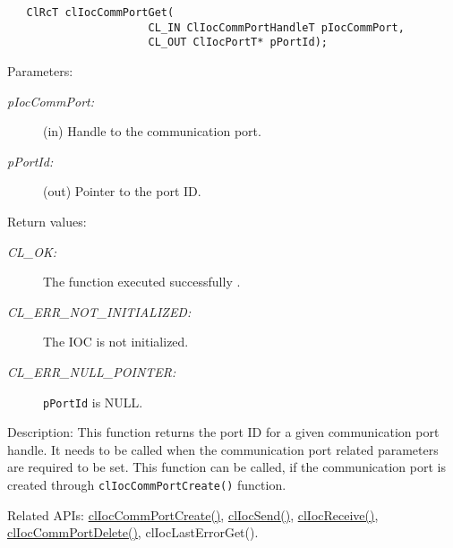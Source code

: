 \begin{flushleft}
\begin{Desc}
\footnotesize\begin{verbatim}   ClRcT clIocCommPortGet( 
                      CL_IN ClIocCommPortHandleT pIocCommPort,  
                      CL_OUT ClIocPortT* pPortId); 
\end{verbatim}
\normalsize
\end{Desc}
\begin{Desc}
\item[Parameters:]
\begin{description}
\item[{\em p\-Ioc\-Comm\-Port:}](in) Handle to the communication port. 
\item[{\em p\-Port\-Id:}](out) Pointer to the port ID.
\end{description}
\end{Desc}
\begin{Desc}
\item[Return values:]
\begin{description}
\item[{\em CL\_\-OK:}]The function executed successfully . 
\item[{\em CL\_\-ERR\_\-NOT\_\-INITIALIZED:}]The IOC is not initialized.
\item[{\em CL\_\-ERR\_\-NULL\_\-POINTER:}] {\tt{pPortId}} is NULL.\end{description}
\end{Desc}
\begin{Desc}
\item[Description: ]This function returns the port ID for a given communication port handle. It needs to be called when the communication port related
parameters are required to be set. This function can be called, if the communication port is created through {\tt{clIocCommPortCreate()}} function.\end{Desc}
\begin{Desc}
\item[Related APIs:]\hyperlink{pageioc101}{clIocCommPortCreate()}, \hyperlink{pageioc104}{clIocSend()}, 
\hyperlink{pageioc105}{clIocReceive()}, \hyperlink{pageioc103}{clIocCommPortDelete()}, clIocLastErrorGet(). 
\end{Desc}
\newpage




\end{flushleft}
